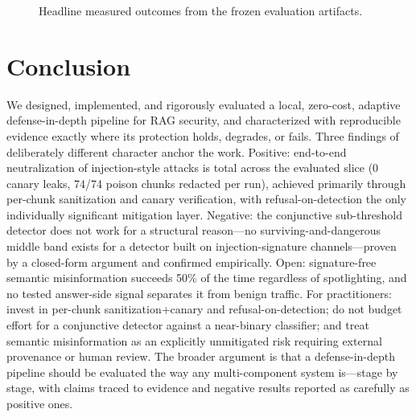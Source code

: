 \documentclass[conference]{IEEEtran}
\begin{document}
\begin{figure}[t]
\centering
{}
\caption{Headline measured outcomes from the frozen evaluation artifacts.}
\label{fig:headline}
\end{figure}

\section{Conclusion}
We designed, implemented, and rigorously evaluated a local, zero-cost, adaptive defense-in-depth pipeline for RAG security, and characterized with reproducible evidence exactly where its protection holds, degrades, or fails. Three findings of deliberately different character anchor the work. Positive: end-to-end neutralization of injection-style attacks is total across the evaluated slice (0 canary leaks, 74/74 poison chunks redacted per run), achieved primarily through per-chunk sanitization and canary verification, with refusal-on-detection the only individually significant mitigation layer. Negative: the conjunctive sub-threshold detector does not work for a structural reason---no surviving-and-dangerous middle band exists for a detector built on injection-signature channels---proven by a closed-form argument and confirmed empirically. Open: signature-free semantic misinformation succeeds 50\% of the time regardless of spotlighting, and no tested answer-side signal separates it from benign traffic. For practitioners: invest in per-chunk sanitization+canary and refusal-on-detection; do not budget effort for a conjunctive detector against a near-binary classifier; and treat semantic misinformation as an explicitly unmitigated risk requiring external provenance or human review. The broader argument is that a defense-in-depth pipeline should be evaluated the way any multi-component system is---stage by stage, with claims traced to evidence and negative results reported as carefully as positive ones.



\end{document}
